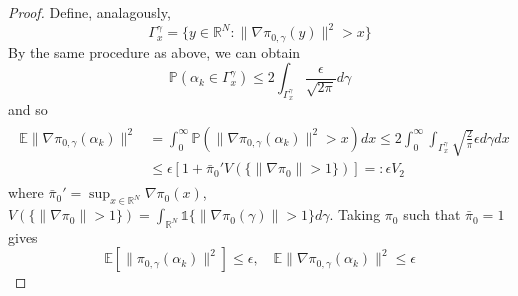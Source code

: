 \documentclass[journal,onecolumn]{IEEEtran}
\newcommand{\alk}{\alpha_k}
\newcommand{\alkm}{\alpha_{k-1}}
\newcommand{\step}{\epsilon}
\newcommand{\grad}{\nabla}
\newcommand{\gaus}{\mathcal{N}}
\newcommand{\reals}{\mathbb{R}}
\newcommand{\CE}{\mathbb{E}}
\newcommand{\PR}{\mathbb{P}}
\newcommand{\dimn}{N}
\newcommand{\idistr}{\ids_0}
\newcommand{\ids}{\pi}
\newcommand{\idistmax}{\bar{\ids}_0}
\newcommand{\idw}{\gamma}
\newcommand{\isp}{0,\idw}
\newcommand{\idistmaxw}{\bar{\ids}_{\isp}}
\newcommand{\levxw}{\Delta_{x}^{\idw}}
\newcommand{\levxwp}{\hat{\Delta}_x^{\idw}}
\newcommand{\wtk}{\zeta_{\alpha_{k-1}}^{\step,\idw}}
\newcommand{\idistrw}{\ids_{\isp}}
\newcommand{\idistgmax}{\idistmax'}
\newcommand{\igbd}{V_2}
\begin{document}
{\begin{proof}

Define, analagously,  
\[\Gamma_x^{\idw} = \{y \in \reals^{\dimn}  : \|\grad\idistrw(y)\|^2 > x\}\]
By the same procedure as above, we can obtain
\[\PR(\alk \in \Gamma_x^{\idw}) \leq 2\int_{\Gamma_x^{\idw}}\frac{\step}{\sqrt{2\pi}}d\gamma\]
and so
\begin{align*}
    \begin{split}
        \CE\|\grad\idistrw(\alk)\|^2 &= \int_0^{\infty}\PR(\|\grad\idistrw(\alk)\|^2 > x)dx \leq 2\int_0^{\infty}\int_{\Gamma_x^{\idw}}\sqrt{\frac{2}{\pi}}\step d\gamma dx \\
        &\leq  \step\left[ 1 + \idistgmax V(\{\|\grad\idistr\|>1\})\right] =:\step \igbd
    \end{split}
\end{align*}
where $\idistgmax = \sup_{x\in\reals^{\dimn}}\grad\idistr(x)$, $V(\{\|\grad\idistr\|>1\}) = \int_{\reals^{\dimn}}\mathds{1}\{\|\grad\idistr(\gamma)\|>1\}d\gamma$.
Taking $\idistr$ such that $\idistmax = 1$  gives
\[ \CE\left[\|\idistrw(\alk)\|^2\right] \leq \step,  \quad \CE\|\grad\idistrw(\alk)\|^2 \leq \step\]
\end{proof}

}
\end{document}
